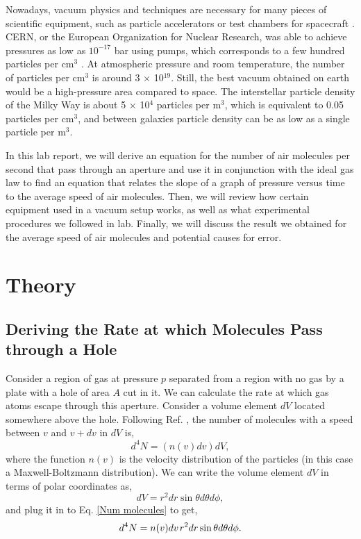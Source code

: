 \documentclass[11pt,letterpaper]{article}
\begin{document}
Nowadays, vacuum physics and techniques are necessary for many pieces of scientific equipment, such as particle accelerators or test chambers for spacecraft \cite{Mark}. CERN, or the European Organization for Nuclear Research, was able to achieve pressures as low as $10^{-17}$ bar using pumps, which corresponds to a few hundred particles per cm$^{3}$ \cite{Marquardt}. At atmospheric pressure and room temperature, the number of particles per cm$^{3}$ is around 3 $\times$ 10$^{19}$. Still, the best vacuum obtained on earth would be a high-pressure area compared to space. The interstellar particle density of the Milky Way is about 5 $\times$ 10$^{4}$ particles per m$^{3}$, which is equivalent to 0.05 particles per cm$^3$, and between galaxies particle density can be as low as a single particle per m$^3$.

In this lab report, we will derive an equation for the number of air molecules per second that pass through an aperture and use it in conjunction with the ideal gas law to find an equation that relates the slope of a graph of pressure versus time to the average speed of air molecules. Then, we will review how certain equipment used in a vacuum setup works, as well as what experimental procedures we followed in lab. Finally, we will discuss the result we obtained for the average speed of air molecules and potential causes for error.



\section{Theory}

\subsection{Deriving the Rate at which Molecules Pass through a Hole}

Consider a region of gas at pressure $p$ separated from a region with no gas by a plate with a hole of area $A$ cut in it. We can calculate the rate at which gas atoms escape through this aperture. Consider a volume element $dV$ located somewhere above the hole. Following Ref. \cite{Mark}, the number of molecules with a speed between $v$ and $v+dv$ in $dV$ is,
\begin{equation}
    d^4N = (n(v) dv) dV , \label{Num molecules}
\end{equation}
where the function $n(v)$ is the velocity distribution of the particles (in this case a Maxwell-Boltzmann distribution). We can write the volume element $dV$ in terms of polar coordinates as,
\begin{equation}
    dV = r^2 dr \sin \theta d\theta d\phi ,
\end{equation}
and plug it in to Eq. \eqref{Num molecules} to get,
\begin{equation}
    d^4N = n(v) dv\mkern2mu r^2 dr \sin \theta d\theta d\phi . \label{dif eq}
\end{equation}
\end{document}
